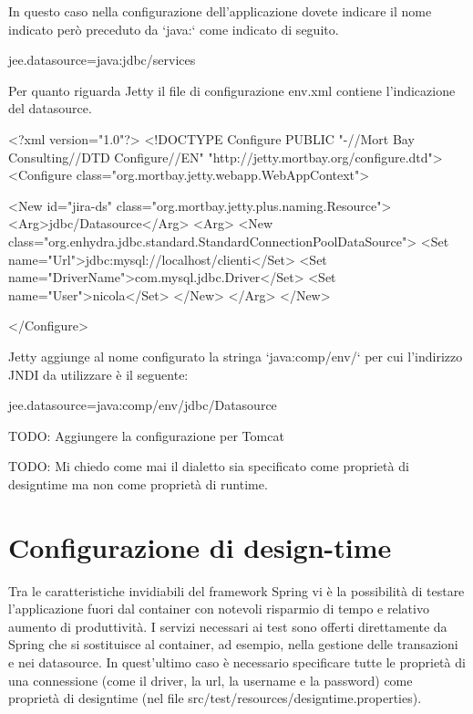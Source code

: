 In questo caso nella configurazione dell'applicazione dovete indicare il nome indicato però preceduto da `java:` come indicato di seguito.

\begin{bash}
jee.datasource=java:jdbc/services
\end{bash}


Per quanto riguarda Jetty il file di configurazione env.xml contiene l'indicazione del datasource.

\begin{xml}
<?xml version="1.0"?>
<!DOCTYPE Configure PUBLIC "-//Mort Bay Consulting//DTD Configure//EN" "http://jetty.mortbay.org/configure.dtd">
<Configure class="org.mortbay.jetty.webapp.WebAppContext">

  <New id="jira-ds" class="org.mortbay.jetty.plus.naming.Resource">
     <Arg>jdbc/Datasource</Arg>
       <Arg>
         <New class="org.enhydra.jdbc.standard.StandardConnectionPoolDataSource">
           <Set name="Url">jdbc:mysql://localhost/clienti</Set>
           <Set name="DriverName">com.mysql.jdbc.Driver</Set>
           <Set name="User">nicola</Set>
         </New>
      </Arg>
  </New>

</Configure>

\end{xml}

Jetty aggiunge al nome configurato la stringa `java:comp/env/` per cui l'indirizzo JNDI da utilizzare è il seguente:

\begin{bash}
jee.datasource=java:comp/env/jdbc/Datasource
\end{bash}

TODO: Aggiungere la configurazione per Tomcat

TODO: Mi chiedo come mai il dialetto sia specificato come proprietà di designtime ma non come proprietà di runtime.



\section{Configurazione di design-time}
Tra le caratteristiche invidiabili del framework Spring vi è la possibilità di testare l'applicazione fuori dal container con notevoli risparmio di tempo e relativo aumento di produttività. I servizi necessari ai test sono offerti direttamente da Spring che si sostituisce al container, ad esempio, nella gestione delle transazioni e nei datasource. In quest'ultimo caso è necessario specificare tutte le proprietà di una connessione (come il driver, la url, la username e la password) come proprietà di designtime (nel file src/test/resources/designtime.properties).

